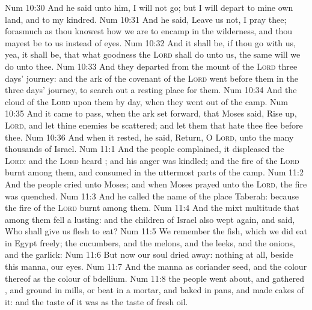 \vs Num 10:30 And he said unto him, I will not go; but I will depart to mine own land, and to my kindred.
\vs Num 10:31 And he said, Leave us not, I pray thee; forasmuch as thou knowest how we are to encamp in the wilderness, and thou mayest be to us instead of eyes.
\vs Num 10:32 And it shall be, if thou go with us, yea, it shall be, that what goodness the \textsc{Lord} shall do unto us, the same will we do unto thee.
\vs Num 10:33 And they departed from the mount of the \textsc{Lord} three days' journey: and the ark of the covenant of the \textsc{Lord} went before them in the three days' journey, to search out a resting place for them.
\vs Num 10:34 And the cloud of the \textsc{Lord}  upon them by day, when they went out of the camp.
\vs Num 10:35 And it came to pass, when the ark set forward, that Moses said, Rise up, \textsc{Lord}, and let thine enemies be scattered; and let them that hate thee flee before thee.
\vs Num 10:36 And when it rested, he said, Return, O \textsc{Lord}, unto the many thousands of Israel.
\vs Num 11:1 And  the people complained, it displeased the \textsc{Lord}: and the \textsc{Lord} heard ; and his anger was kindled; and the fire of the \textsc{Lord} burnt among them, and consumed  in the uttermost parts of the camp.
\vs Num 11:2 And the people cried unto Moses; and when Moses prayed unto the \textsc{Lord}, the fire was quenched.
\vs Num 11:3 And he called the name of the place Taberah: because the fire of the \textsc{Lord} burnt among them.
\vs Num 11:4 And the mixt multitude that  among them fell a lusting: and the children of Israel also wept again, and said, Who shall give us flesh to eat?
\vs Num 11:5 We remember the fish, which we did eat in Egypt freely; the cucumbers, and the melons, and the leeks, and the onions, and the garlick:
\vs Num 11:6 But now our soul  dried away:  nothing at all, beside this manna,  our eyes.
\vs Num 11:7 And the manna  as coriander seed, and the colour thereof as the colour of bdellium.
\vs Num 11:8  the people went about, and gathered , and ground  in mills, or beat  in a mortar, and baked  in pans, and made cakes of it: and the taste of it was as the taste of fresh oil.
